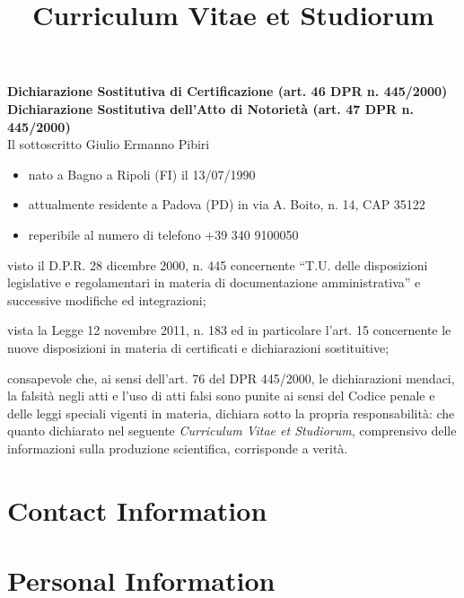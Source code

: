 \documentclass[a4paper, sans]{moderncv}
\title{Curriculum Vitae et Studiorum}
\newcommand{\return}{\vspace{0.3cm}}
\begin{document}
\textbf{Dichiarazione Sostitutiva di Certificazione (art. 46 DPR n. 445/2000)} \\
\textbf{Dichiarazione Sostitutiva dell'Atto di Notorietà (art. 47 DPR n. 445/2000)} \\

Il sottoscritto Giulio Ermanno Pibiri

\begin{itemize}
    \item nato a Bagno a Ripoli (FI) il 13/07/1990
    \item attualmente residente a Padova (PD) in via A. Boito, n. 14, CAP 35122
    \item reperibile al numero di telefono +39 340 9100050
\end{itemize}
\return

visto il D.P.R. 28 dicembre 2000, n. 445 concernente ``T.U. delle disposizioni
legislative e regolamentari in materia di documentazione amministrativa''
e successive modifiche ed integrazioni;
\return

vista la Legge 12 novembre 2011, n. 183 ed in particolare l'art. 15 concernente
le nuove disposizioni in materia di certificati e dichiarazioni sostituitive;
\return

consapevole che, ai sensi dell'art. 76 del DPR 445/2000, le dichiarazioni mendaci,
la falsità negli atti e l'uso di atti falsi sono punite ai sensi del Codice penale
e delle leggi speciali vigenti in materia,
dichiara sotto la propria responsabilità:
che quanto dichiarato nel seguente \emph{Curriculum Vitae et Studiorum},
comprensivo delle informazioni sulla produzione scientifica, corrisponde a verità.

\vspace{6cm}

\makecvtitle

\section{Contact Information}

\section{Personal Information}
\end{document}
